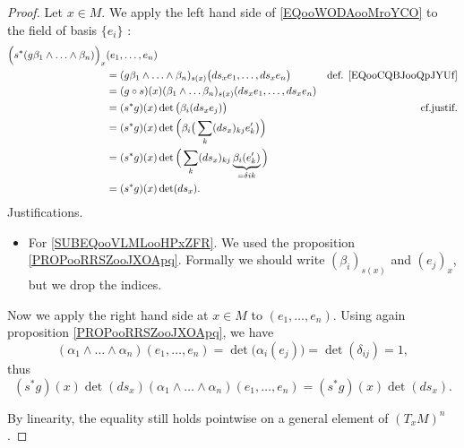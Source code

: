 \begin{proof}
	Let \( x\in M\). We apply the left hand side of \eqref{EQooWODAooMroYCO} to the field of basis \( \{ e_i \}\) :
	\begin{subequations}
		\begin{align}
			\Big( s^*(g\beta_1\wedge \ldots \wedge\beta_n) \Big)_x & (e_1,\ldots,e_n)                                                       \nonumber                                                     \\
			                                                       & =(g\beta_1\wedge \ldots\wedge \beta_n)_{s(x)}\big( ds_xe_1,\ldots,ds_xe_n \big)       & \text{def. \eqref{EQooCQBJooQpJYUf}}         \\
			                                                       & = (g\circ s)(x)(\beta_1\wedge\ldots \beta_n)_{s(x)}(ds_xe_1,\ldots,ds_xe_n)                                                          \\
			                                                       & = (s^*g)(x)\det\big( \beta_i(ds_xe_j) \big)                                           & \text{cf.justif.}		\label{SUBEQooVLMLooHPxZFR} \\
			                                                       & = (s^*g)(x)\det\Big( \beta_i\big( \sum_k(ds_x)_{kj}e'_k \big) \Big)                                                                  \\
			                                                       & = (s^*g)(x)\det\Big(  \sum_k(ds_x)_{kj}\underbrace{\beta_i(e'_k)}_{=\delta{ik}} \Big)                                                \\
			                                                       & = (s^*g)(x)\det(ds_x).
		\end{align}
	\end{subequations}
	Justifications.
	\begin{itemize}
		\item
		      For \eqref{SUBEQooVLMLooHPxZFR}. We used the proposition \ref{PROPooRRSZooJXOApq}. Formally we should write \( (\beta_i)_{s(x)}\) and \( (e_j)_x\), but we drop the indices.
	\end{itemize}
	Now we apply the right hand side at \( x\in M\) to \( (e_1,\ldots,e_n)\). Using again proposition \ref{PROPooRRSZooJXOApq}, we have
	\begin{equation}
		(\alpha_1\wedge\ldots\wedge \alpha_n)(e_1,\ldots,e_n)=\det\big( \alpha_i(e_j) \big)=\det(\delta_{ij})=1,
	\end{equation}
	thus
	\begin{equation}
		(s^*g)(x)\det(ds_x)(\alpha_1\wedge\ldots\wedge \alpha_n)(e_1,\ldots,e_n)=(s^*g)(x)\det(ds_x).
	\end{equation}

	By linearity, the equality still holds pointwise on a general element of \(  (T_xM)^n\).
\end{proof}


